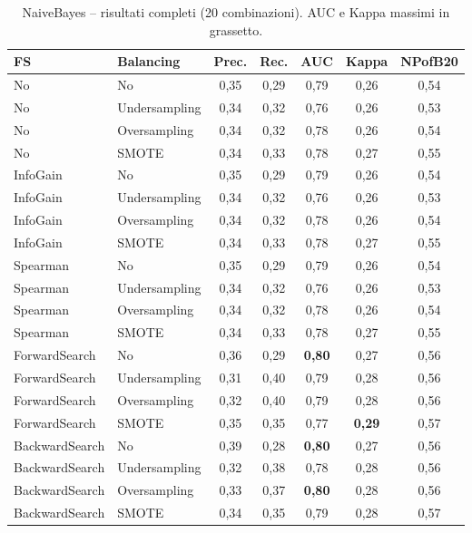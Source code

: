 \begin{table}[h!]
\centering
\small
\begin{tabular}{@{}llccccc@{}}
\toprule
\textbf{FS} & \textbf{Balancing} & \textbf{Prec.} & \textbf{Rec.} &
\textbf{AUC} & \textbf{Kappa} & \textbf{NPofB20} \\
\midrule
No             & No            & 0,35 & 0,29 & 0,79 & 0,26 & 0,54 \\
No             & Undersampling & 0,34 & 0,32 & 0,76 & 0,26 & 0,53 \\
No             & Oversampling  & 0,34 & 0,32 & 0,78 & 0,26 & 0,54 \\
No             & SMOTE         & 0,34 & 0,33 & 0,78 & 0,27 & 0,55 \\
InfoGain       & No            & 0,35 & 0,29 & 0,79 & 0,26 & 0,54 \\
InfoGain       & Undersampling & 0,34 & 0,32 & 0,76 & 0,26 & 0,53 \\
InfoGain       & Oversampling  & 0,34 & 0,32 & 0,78 & 0,26 & 0,54 \\
InfoGain       & SMOTE         & 0,34 & 0,33 & 0,78 & 0,27 & 0,55 \\
Spearman       & No            & 0,35 & 0,29 & 0,79 & 0,26 & 0,54 \\
Spearman       & Undersampling & 0,34 & 0,32 & 0,76 & 0,26 & 0,53 \\
Spearman       & Oversampling  & 0,34 & 0,32 & 0,78 & 0,26 & 0,54 \\
Spearman       & SMOTE         & 0,34 & 0,33 & 0,78 & 0,27 & 0,55 \\
ForwardSearch  & No            & 0,36 & 0,29 & \textbf{0,80} & 0,27 & 0,56 \\
ForwardSearch  & Undersampling & 0,31 & 0,40 & 0,79 & 0,28 & 0,56 \\
ForwardSearch  & Oversampling  & 0,32 & 0,40 & 0,79 & 0,28 & 0,56 \\
ForwardSearch  & SMOTE         & 0,35 & 0,35 & 0,77 & \textbf{0,29} & 0,57 \\
BackwardSearch & No            & 0,39 & 0,28 & \textbf{0,80} & 0,27 & 0,56 \\
BackwardSearch & Undersampling & 0,32 & 0,38 & 0,78 & 0,28 & 0,56 \\
BackwardSearch & Oversampling  & 0,33 & 0,37 & \textbf{0,80} & 0,28 & 0,56 \\
BackwardSearch & SMOTE         & 0,34 & 0,35 & 0,79 & 0,28 & 0,57 \\
\bottomrule
\end{tabular}
\caption{NaiveBayes -- risultati completi (20 combinazioni). AUC e Kappa massimi in grassetto.}
\label{tab:nb-full}
\end{table}

